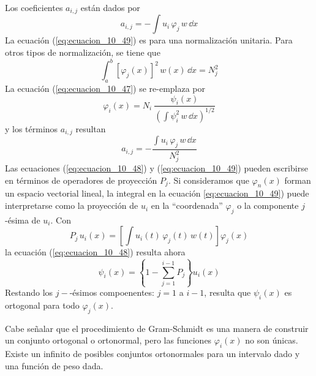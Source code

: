 Los coeficientes $a_{i, j}$ están dados por
\begin{equation}
a_{i, j} = - \int u_{i} \, \varphi_{j} \, w \, \dd x
\label{eq:ecuacion_10_49}
\end{equation}
La ecuación (\ref{eq:ecuacion_10_49}) es para una normalización unitaria. Para otros tipos de normalización, se tiene que
\[ \int_{a}^{b} \left[ \varphi_{j} (x) \right]^{2} \, w(x) \, \dd x =  N_{j}^{2} \]
La ecuación (\ref{eq:ecuacion_10_47}) se re-emplaza por
\begin{equation}
\varphi_{i}(x) =  N_{i} \: \dfrac{\psi_{i}(x)}{\left( \int \psi_{i}^{2} \, w \, \dd x \right)^{1/2}}
\label{eq:ecuacion_10_47a}
\end{equation}
y los términos $a_{i,j}$ resultan
\begin{equation}
a_{i, j} = - \dfrac{\int u_{i} \, \varphi_{j} \, w \, \dd x}{N_{j}^{2}}
\label{eq:ecuacion_10_49a}
\end{equation}
Las ecuaciones (\ref{eq:ecuacion_10_48}) y (\ref{eq:ecuacion_10_49}) pueden escribirse en términos de operadores de proyección $P_{j}$. Si consideramos que $\varphi_{n}(x)$ forman un espacio vectorial lineal, la integral en la ecuación \ref{eq:ecuacion_10_49}) puede interpretarse como la proyección de $u_{i}$ en la \enquote{coordenada} $\varphi_{j}$ o la componente $j$-ésima de $u_{i}$. Con
\[ P_{j} \, u_{i}(x) = \left[ \int u_{i}(t) \, \varphi_{j}(t) \, w(t) \right] \varphi_{j}(x) \]
la ecuación (\ref{eq:ecuacion_10_48}) resulta ahora
\begin{equation}
\psi_{i}(x) = \left\{ 1 - \sum_{j=1}^{i-1} P_{j} \right\} u_{i}(x)
\label{eq:ecuacion_10_48a}
\end{equation}
Restando los $j-$-ésimos compoenentes: $j=1$ a $i-1$, resulta que $\psi_{i}(x)$ es ortogonal para todo $\varphi_{j}(x)$.
\par
 Cabe señalar que el procedimiento de Gram-Schmidt es una manera de construir un conjunto ortogonal o ortonormal, pero las funciones $\varphi_{i}(x)$ no son únicas. Existe un infinito de posibles conjuntos ortonormales para un intervalo dado y una función de peso dada.
